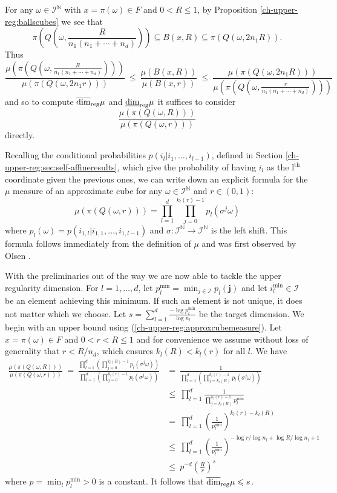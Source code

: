 For any $\omega \in \mathcal{I}^{\mathbb{N}}$ with $x= \pi(\omega) \in F$ and $0<R\le 1$, by Proposition \ref{ch-upper-reg:ballscubes} we see that
\[
\pi(Q(\omega, \frac{R}{n_1(n_1+ \cdots + n_d)}))  \subseteq B(x,R) \subseteq \pi (Q(\omega,2 n_1 R)).
\]
Thus
\[
\frac{\mu \left(\pi \left(Q\left(\omega,\frac{R}{n_1(n_1+ \cdots + n_d)}\right)\right)\right)} {\mu(\pi(Q(\omega,2n_1 r)))} \ \leq \  \frac{\mu(B(x,R))}{\mu(B(x,r))}  \ \leq \ \frac{\mu(\pi(Q(\omega,2n_1 R)))}{\mu \left(\pi \left(Q\left(\omega,\frac{r}{n_1(n_1+ \cdots + n_d)}\right)\right)\right)}
\]
and so to compute $\overline{\dim}_{\textup{reg}} \mu$ and $\underline{\dim}_{\textup{reg}} \mu$ it suffices to consider 
\[
\frac{\mu(\pi(Q(\omega,R)))}{\mu(\pi(Q(\omega,r)))} 
\]
directly. 


Recalling the conditional probabilities $p(i_{l}\vert i_{1},\ldots,i_{l-1})$, defined in Section \ref{ch-upper-reg:sec:self-affineresults}, which give the probability of having $i_{l}$ as the $\text{l}^{\text{th}}$ coordinate given the previous ones, we can write down an explicit formula for the $\mu $ measure of an approximate cube for any $\omega \in \mathcal{I}^{\mathbb{N}}$ and $r \in (0,1)$:
\begin{equation} \label{ch-upper-reg:approxcubemeasure}
\mu(\pi(Q(\omega,r)))=\prod^d_{l=1} \prod_{j=0}^{k_l(r)-1}p_l(\sigma^j\omega)
\end{equation}
where $p_l(\omega)=p(i_{1,l}\vert i_{1,1},\ldots,i_{1,l-1})$ and $\sigma: \mathcal{I}^{\mathbb{N}} \to \mathcal{I}^{\mathbb{N}}$ is the left shift.  This formula follows immediately from the definition of $\mu$ and was first observed by Olsen \cite[Equation 6.2]{sponges}.

With the preliminaries out of the way we are now able to tackle the upper regularity dimension. For $l=1,\ldots, d$, let $p_l^{\text{min}}=\min_{j\in \mathcal{I}} p_l(\mathbf{j})$  and let  $i_l^{\min} \in \mathcal{I}$ be an element achieving this minimum.  If such an element is not unique, it does not matter which we choose. Let $s=\sum_{l=1}^d\frac{-\log p_l^{\text{min}}}{\log n_l}$ be the target dimension. We begin with an upper bound using (\ref{ch-upper-reg:approxcubemeasure}). Let $x = \pi(\omega ) \in F$ and $0< r < R\le 1$ and for convenience we assume without loss of generality that $r < R/ n_d$, which ensures $k_l(R) < k_l(r)$ for all $l$.  We have
\begin{align*}
\frac{\mu(\pi(Q(\omega,R)))}{\mu(\pi(Q(\omega,r)))} \ = \ \frac{\prod_{l=1}^d\left(\prod_{j=0}^{k_l(R)-1}p_l(\sigma^j \omega) \right)}{\prod_{l=1}^d\left(\prod_{j=0}^{k_l(r)-1}p_l(\sigma^j \omega) \right)}  & = \ \frac{1}{\prod_{l=1}^d\left(\prod_{j=k_l(R)}^{k_l(r)-1}p_l(\sigma^j \omega) \right)} \\
& \le\  \prod_{l=1}^d \frac{1}{\prod_{j=k_l(R)}^{k_l(r)-1}p_l^{\text{min}}} \\
& =\  \prod_{l=1}^d\left( \frac{1}{p_l^{\text{min}}}\right)^{k_l(r)-k_l(R)} \\
& \le\  \prod_{l=1}^d \left( \frac{1}{p_l^{\text{min}}}\right)^{-\log r/\log n_l + \log R/\log n_l + 1}  \\
& \le \ p^{-d} \left( \frac{R}{r} \right)^{s}
\end{align*}
where $p = \min_l p_l^{\text{min}}>0$ is a constant. It follows that $\overline{\dim}_{\textup{reg}} \mu \leqslant s$.

